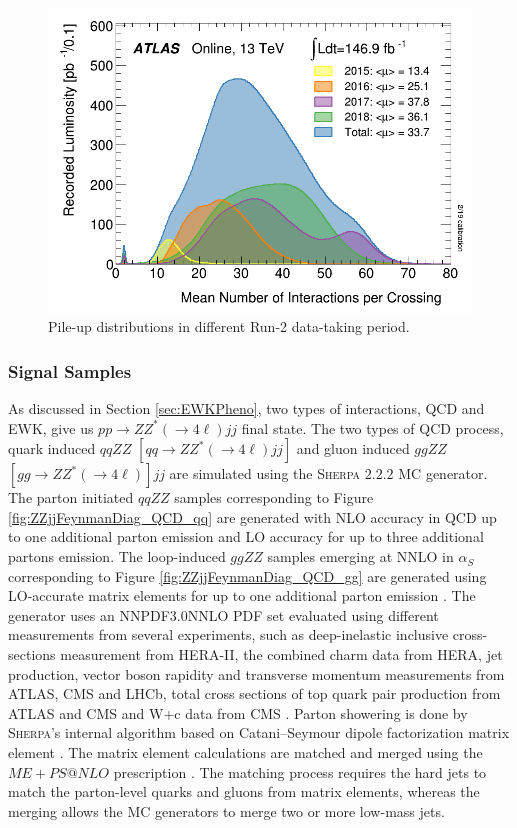 \begin{figure}[!htb]
  \centering
  \includegraphics[width=.8\linewidth]{figures/AnalysisOverview/mu_ProfileRun2.pdf}
  \caption{Pile-up distributions in different Run-2 data-taking period.\label{fig:PileupDiffRuns} \cite{ATLASRun2DataTaking}}
\end{figure}

\subsubsection{Signal Samples}
\label{subsubsec:SigSamples}
As discussed in Section \ref{sec:EWKPheno}, two types of interactions, QCD and EWK, give us $pp \rightarrow ZZ^*(\rightarrow 4 \ell) jj$ final state. The two types of QCD process, quark induced $qqZZ$ $[qq \rightarrow ZZ^*(\rightarrow 4 \ell) jj]$ and gluon induced $ggZZ$ $[gg \rightarrow ZZ^* (\rightarrow 4\ell) ]jj$ are simulated using the \textsc{Sherpa} $2.2.2$ MC generator. The parton initiated $qqZZ$ samples corresponding to Figure \ref{fig:ZZjjFeynmanDiag_QCD_qq} are generated with NLO accuracy in QCD up to one additional parton emission and LO accuracy for up to three additional partons emission. The loop-induced $ggZZ$ samples emerging at NNLO in $\alpha_{S}$ corresponding to Figure \ref{fig:ZZjjFeynmanDiag_QCD_gg} are generated using LO-accurate matrix elements for up to one additional parton emission \cite{EventGenWithSherpa}. The generator uses an NNPDF3.0NNLO PDF set evaluated using different measurements from several experiments, such as deep-inelastic inclusive cross-sections measurement from HERA-II, the combined charm data from HERA, jet production, vector boson rapidity and transverse momentum measurements from ATLAS, CMS and LHCb, total cross sections of top quark pair production from ATLAS and CMS and W+c data from CMS \cite{PDFForRunII}. Parton showering is done by \textsc{Sherpa}'s internal algorithm based on Catani–Seymour dipole factorization matrix element \cite{SherpaPS}. The matrix element calculations are matched and merged using the $ME+PS@NLO$ prescription \cite{PSMatching}. The matching process requires the hard jets to match the parton-level quarks and gluons from matrix elements, whereas the merging allows the MC generators to merge two or more low-mass jets. 

